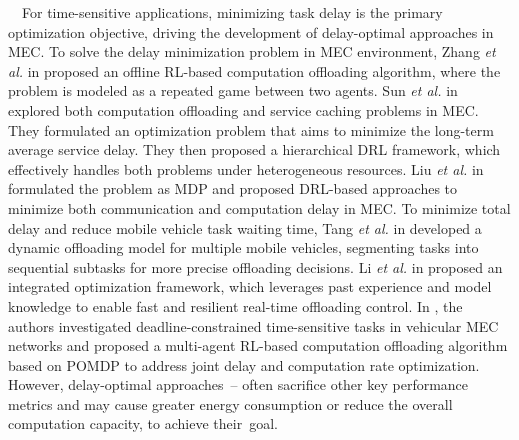 \documentclass[12pt,draftclsnofoot,onecolumn]{IEEEtran}
\newenvironment{my}[2]%
{\begin{list}{}%
{\setlength{\rightmargin}{#1}\setlength{\leftmargin}{#2}}%


 \item[]{}

} {\end{list}}
\begin{document}
\begin{enumerate}
\begin{my}{1cm}{1cm}
{		
		\,\,\,\,
		For time-sensitive applications, minimizing task delay is the primary optimization objective, driving the development of delay-optimal approaches in MEC. 
		To solve the delay minimization problem in MEC environment, Zhang \textit{et al.} in \cite{zhang2023offline} proposed an offline RL-based computation offloading algorithm, where the problem is modeled as a repeated game between two agents.
		Sun \textit{et al.} in \cite{sun2024hierarchical} explored both computation offloading and service caching problems in MEC. They formulated an optimization problem that aims to minimize the long-term average service delay. They then proposed a hierarchical DRL framework, which effectively handles both problems under heterogeneous resources. Liu \textit{et al.} in \cite{liu2022deep} formulated the problem as MDP and proposed DRL-based approaches to minimize both communication and computation delay in MEC.
		To minimize total delay and reduce mobile vehicle task waiting time, Tang \textit{et al.} in \cite{tang2022double} developed a dynamic offloading model for multiple mobile vehicles, segmenting tasks into sequential subtasks for more precise offloading decisions.
		Li \textit{et al.} in \cite{li2022integrated} proposed an integrated optimization framework, which leverages past experience and model knowledge to enable fast and resilient real-time offloading control. 
		In \cite{wei2023many}, the authors investigated deadline-constrained time-sensitive tasks in vehicular MEC networks and proposed a multi-agent RL-based computation offloading algorithm based on POMDP to address joint delay and computation rate optimization. However, delay-optimal approaches~\cite{zhang2023offline}--\cite{wei2023many} often sacrifice other key performance metrics and may cause greater energy consumption or reduce the overall computation capacity, to achieve their~goal. \vspace{2mm}
		
}
\end{my}
\end{enumerate}
\end{document}
